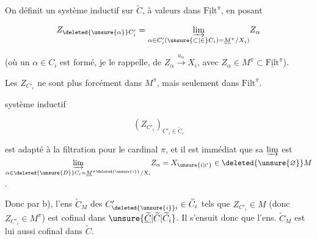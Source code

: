

On définit un système inductif sur $\widetilde C$, à valeurs dans $\underline{\mathrm{Filt}}^{\pi}$, en posant

\[
 Z_{\deleted{\unsure{\alpha}} C'_i}=\underset{\alpha\in C'_i(\unsure{\subset|\in} C_i)=\underline M^\pi/X_i)}{\varinjlim} Z_\alpha
\]

(où un $\alpha\in C_i$ est formé, je le rappelle, de $Z_\alpha\xrightarrow{u_\alpha}X_i$, avec $Z_\alpha\in M^\pi\subset\underline{\mathrm{Filt}}^\pi$).

Les $Z_{C'_i}$ ne sont plus forcément dans $M^\pi$, mais seulement dans $\mathrm{Filt}^\pi$.   

  système inductif

\[
 (Z_{C'_i})_{C'_i\in\widetilde C_i}
\]

est   adapté à la filtration  pour le cardinal $\pi$, et il est immédiat que sa $\varinjlim$ est  $\underset{\alpha\in\deleted{\unsure{D}} C_i=\underline M^{\pi\deleted{\unsure{i}}}/X_i}{\varinjlim} Z_\alpha=X_{\unsure{i|i'}}\in\deleted{\unsure{\varnothing}} M$.

Donc par b), l'ens  $\widetilde C_M$ des $C'_{\deleted{\unsure{i}} i}\in\widetilde C_i$ tels que $Z_{C'_i}\in M$ (donc $Z_{C'_i}\in M^\pi$) est cofinal dans $\unsure{\underline{\widetilde C}|\widetilde C|\widetilde C_i}$. Il s'ensuit donc que l'ens. $\widetilde C_M$ est lui aussi cofinal dans $\widetilde C$.


